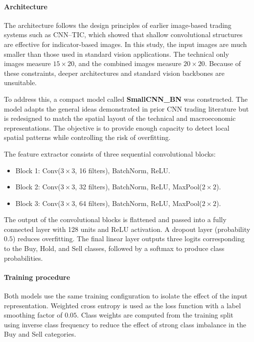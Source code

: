 \documentclass[12pt,a4paper]{article}
\begin{document}
\paragraph{Architecture}

The architecture follows the design principles of earlier image-based trading systems such as CNN--TIC, which showed that shallow convolutional structures are effective for indicator-based images. In this study, the input images are much smaller than those used in standard vision applications. The technical only images measure $15 \times 20$, and the combined images measure $20 \times 20$. Because of these constraints, deeper architectures and standard vision backbones are unsuitable.

To address this, a compact model called \textbf{SmallCNN\_BN} was constructed. The model adapts the general ideas demonstrated in prior CNN trading literature but is redesigned to match the spatial layout of the technical and macroeconomic representations. The objective is to provide enough capacity to detect local spatial patterns while controlling the risk of overfitting.

The feature extractor consists of three sequential convolutional blocks:

\begin{itemize}
	\item Block 1: Conv($3 \times 3$, 16 filters), BatchNorm, ReLU.
	\item Block 2: Conv($3 \times 3$, 32 filters), BatchNorm, ReLU, MaxPool($2 \times 2$).
	\item Block 3: Conv($3 \times 3$, 64 filters), BatchNorm, ReLU, MaxPool($2 \times 2$).
\end{itemize}

The output of the convolutional blocks is flattened and passed into a fully connected layer with 128 units and ReLU activation. A dropout layer (probability $0.5$) reduces overfitting. The final linear layer outputs three logits corresponding to the Buy, Hold, and Sell classes, followed by a softmax to produce class probabilities.

\paragraph{Training procedure}

Both models use the same training configuration to isolate the effect of the input representation. Weighted cross entropy is used as the loss function with a label smoothing factor of $0.05$. Class weights are computed from the training split using inverse class frequency to reduce the effect of strong class imbalance in the Buy and Sell categories.
\end{document}
